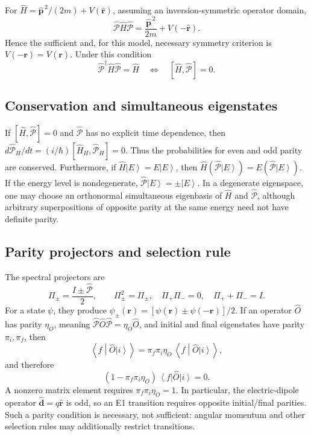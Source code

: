 \documentclass[11pt,a4paper]{article}
\theoremstyle{definition}
\newcommand{\ket}[1]{\left|#1\right\rangle}
\newcommand{\bra}[1]{\left\langle#1\right|}
\newcommand{\ip}[2]{\left\langle#1\middle|#2\right\rangle}
\newcommand{\PP}{\hat{\mathcal P}}
\begin{document}
For \(\hat H=\hat{\mathbf p}^{\,2}/(2m)+V(\hat{\mathbf r})\), assuming an inversion-symmetric operator domain,
\begin{equation}
\PP\hat H\PP=\frac{\hat{\mathbf p}^{\,2}}{2m}+V(-\hat{\mathbf r}).
\end{equation}
Hence the sufficient and, for this model, necessary symmetry criterion is \(V(-\mathbf r)=V(\mathbf r)\). Under this condition
\begin{equation}
\boxed{\PP^\dagger\hat H\PP=\hat H\quad\Longleftrightarrow\quad[\hat H,\PP]=0.}
\label{eq:parity}
\end{equation}
\subsection{Conservation and simultaneous eigenstates}
If \([\hat H,\PP]=0\) and \(\PP\) has no explicit time dependence, then \(d\PP_H/dt=(i/\hbar)[\hat H_H,\PP_H]=0\). Thus the probabilities for even and odd parity are conserved. Furthermore, if \(\hat H\ket E=E\ket E\), then \(\hat H(\PP\ket E)=E(\PP\ket E)\). If the energy level is nondegenerate, \(\PP\ket E=\pm\ket E\). In a degenerate eigenspace, one may choose an orthonormal simultaneous eigenbasis of \(\hat H\) and \(\PP\), although arbitrary superpositions of opposite parity at the same energy need not have definite parity.
\subsection{Parity projectors and selection rule}
The spectral projectors are
\begin{equation}
\boxed{\Pi_\pm=\frac{I\pm\PP}{2},\qquad\Pi_\pm^2=\Pi_\pm,\quad\Pi_+\Pi_-=0,\quad\Pi_++\Pi_-=I.}
\end{equation}
For a state \(\psi\), they produce \(\psi_\pm(\mathbf r)=[\psi(\mathbf r)\pm\psi(-\mathbf r)]/2\). If an operator \(\hat O\) has parity \(\eta_O\), meaning \(\PP\hat O\PP=\eta_O\hat O\), and initial and final eigenstates have parity \(\pi_i,\pi_f\), then
\begin{equation}
\ip{f}{\hat O\ket i}=\pi_f\pi_i\eta_O\,\ip{f}{\hat O\ket i},
\end{equation}
and therefore
\begin{equation}
\boxed{(1-\pi_f\pi_i\eta_O)\,\bra f\hat O\ket i=0.}
\end{equation}
A nonzero matrix element requires \(\pi_f\pi_i\eta_O=1\). In particular, the electric-dipole operator \(\hat{\mathbf d}=q\hat{\mathbf r}\) is odd, so an E1 transition requires opposite initial/final parities. Such a parity condition is necessary, not sufficient: angular momentum and other selection rules may additionally restrict transitions.
\end{document}
